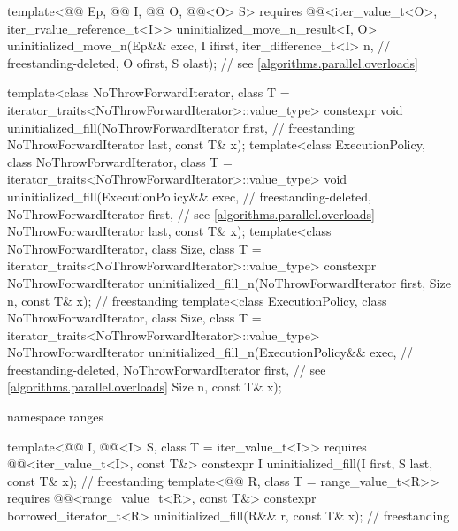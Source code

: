 \begin{codeblock}
{{    template<@@ Ep, @@ I,
             @@ O, @@<O> S>
      requires @@<iter_value_t<O>, iter_rvalue_reference_t<I>>
        uninitialized_move_n_result<I, O>
          uninitialized_move_n(Ep&& exec, I ifirst, iter_difference_t<I> n, // freestanding-deleted,
                               O ofirst, S olast);                          // see \ref{algorithms.parallel.overloads}
  }

  template<class NoThrowForwardIterator,
           class T = iterator_traits<NoThrowForwardIterator>::value_type>
    constexpr void uninitialized_fill(NoThrowForwardIterator first,                 // freestanding
                                      NoThrowForwardIterator last, const T& x);
  template<class ExecutionPolicy, class NoThrowForwardIterator,
           class T = iterator_traits<NoThrowForwardIterator>::value_type>
    void uninitialized_fill(ExecutionPolicy&& exec,                         // freestanding-deleted,
                            NoThrowForwardIterator first,                   // see \ref{algorithms.parallel.overloads}
                            NoThrowForwardIterator last,
                            const T& x);
  template<class NoThrowForwardIterator, class Size,
           class T = iterator_traits<NoThrowForwardIterator>::value_type>
    constexpr NoThrowForwardIterator
      uninitialized_fill_n(NoThrowForwardIterator first, Size n, const T& x);       // freestanding
  template<class ExecutionPolicy, class NoThrowForwardIterator, class Size,
           class T = iterator_traits<NoThrowForwardIterator>::value_type>
    NoThrowForwardIterator
      uninitialized_fill_n(ExecutionPolicy&& exec,                          // freestanding-deleted,
                           NoThrowForwardIterator first,                    // see \ref{algorithms.parallel.overloads}
                           Size n, const T& x);

  namespace ranges {
    template<@@ I, @@<I> S, class T = iter_value_t<I>>
      requires @@<iter_value_t<I>, const T&>
        constexpr I uninitialized_fill(I first, S last, const T& x);                // freestanding
    template<@@ R, class T = range_value_t<R>>
      requires @@<range_value_t<R>, const T&>
        constexpr borrowed_iterator_t<R> uninitialized_fill(R&& r, const T& x);     // freestanding

}}
\end{codeblock}
